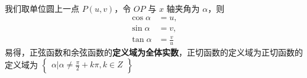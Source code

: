 \begin{issues}
\issueDraft
\end{issues}

我们取单位圆上一点 $P(u,v)$，令 $OP$ 与 $x$ 轴夹角为 $\alpha$，则 
\begin{equation}
\begin{aligned}
\cos\alpha &= u,\\
\sin\alpha &= v,\\
\tan\alpha &= \frac{v}{u}
\end{aligned}
\end{equation}
易得，正弦函数和余弦函数的\textbf{定义域为全体实数}，正切函数的定义域为正切函数的定义域为 $\begin{Bmatrix}\alpha|\alpha \neq \frac{\pi}{2}+k\pi,k\in Z\end{Bmatrix}$